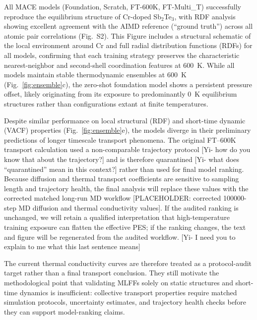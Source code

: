 \documentclass[pdflatex,sn-mathphys-num]{sn-jnl}%
\providecommand{\reviewermap}[3]{}
\theoremstyle{thmstyleone}%
\theoremstyle{thmstyletwo}%
\theoremstyle{thmstylethree}%
\begin{document}
All MACE models (Foundation, Scratch, FT-600K, FT-Multi\_T) successfully reproduce the equilibrium structure of Cr-doped Sb$_2$Te$_3$, with RDF analysis showing excellent agreement with the AIMD reference (``ground truth'') across all atomic pair correlations (Fig.~S2). This Figure includes a structural schematic of the local environment around Cr and full radial distribution functions (RDFs) for all models, confirming that each training strategy preserves the characteristic nearest-neighbor and second-shell coordination features at 600~K. While all models maintain stable thermodynamic ensembles at 600~K (Fig.~\ref{fig:ensemble}c), the zero-shot foundation model shows a persistent pressure offset, likely originating from its exposure to predominantly 0~K equilibrium structures rather than configurations extant at finite temperatures.

\reviewermap{REV-C9}{pending-cluster}{Long-run MD transport values must be replaced by the corrected 100000-step workflow before final submission.}

Despite similar performance on local structural (RDF) and short-time dynamic (VACF) properties (Fig.~\ref{fig:ensemble}e), the models diverge in their preliminary predictions of longer timescale transport phenomena. The original FT--600K transport calculation used a non-comparable trajectory protocol [Yi- how do you know that about the trajectory?] and is therefore quarantined [Yi- what does ``quarantined'' mean in this context?] rather than used for final model ranking. Because diffusion and thermal transport coefficients are sensitive to sampling length and trajectory health, the final analysis will replace these values with the corrected matched long-run MD workflow [PLACEHOLDER: corrected 100000-step MD diffusion and thermal conductivity values]. If the audited ranking is unchanged, we will retain a qualified interpretation that high-temperature training exposure can flatten the effective PES; if the ranking changes, the text and figure will be regenerated from the audited workflow. [Yi- I need you to explain to me what this last sentence means]

The current thermal conductivity curves are therefore treated as a protocol-audit target rather than a final transport conclusion. They still motivate the methodological point that validating MLFFs solely on static structures and short-time dynamics is insufficient: collective transport properties require matched simulation protocols, uncertainty estimates, and trajectory health checks before they can support model-ranking claims.
\end{document}
